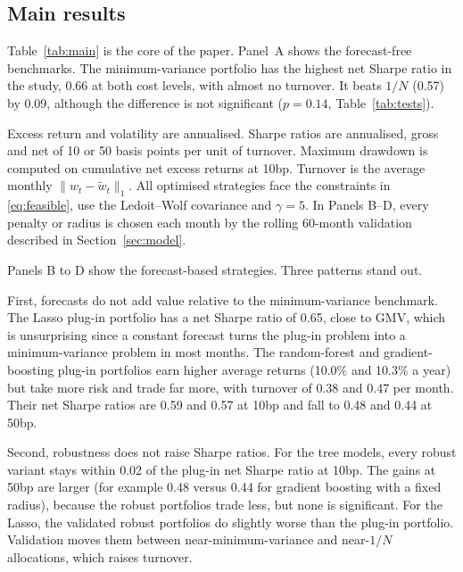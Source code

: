 \documentclass[11pt]{article}
\begin{document}
\subsection{Main results}

Table~\ref{tab:main} is the core of the paper. Panel~A shows the forecast-free benchmarks. The minimum-variance portfolio has the highest net Sharpe ratio in the study, 0.66 at both cost levels, with almost no turnover. It beats $1/N$ (0.57) by 0.09, although the difference is not significant ($p=0.14$, Table~\ref{tab:tests}).

\begin{table}[!htbp]\centering
\caption{Out-of-sample performance, July 1985--June 2026 (492 months)}\label{tab:main}
\small
\begin{minipage}{0.97\linewidth}\footnotesize\smallskip
Excess return and volatility are annualised. Sharpe ratios are annualised, gross and net of 10 or 50 basis points per unit of turnover. Maximum drawdown is computed on cumulative net excess returns at 10bp. Turnover is the average monthly $\lVert w_t-\tilde w_t\rVert_1$. All optimised strategies face the constraints in \eqref{eq:feasible}, use the Ledoit--Wolf covariance and $\gamma=5$. In Panels B--D, every penalty or radius is chosen each month by the rolling 60-month validation described in Section~\ref{sec:model}.
\end{minipage}
\end{table}

Panels B to D show the forecast-based strategies. Three patterns stand out.

First, forecasts do not add value relative to the minimum-variance benchmark. The Lasso plug-in portfolio has a net Sharpe ratio of 0.65, close to GMV, which is unsurprising since a constant forecast turns the plug-in problem into a minimum-variance problem in most months. The random-forest and gradient-boosting plug-in portfolios earn higher average returns (10.0\% and 10.3\% a year) but take more risk and trade far more, with turnover of 0.38 and 0.47 per month. Their net Sharpe ratios are 0.59 and 0.57 at 10bp and fall to 0.48 and 0.44 at 50bp.

Second, robustness does not raise Sharpe ratios. For the tree models, every robust variant stays within 0.02 of the plug-in net Sharpe ratio at 10bp. The gains at 50bp are larger (for example 0.48 versus 0.44 for gradient boosting with a fixed radius), because the robust portfolios trade less, but none is significant. For the Lasso, the validated robust portfolios do slightly worse than the plug-in portfolio. Validation moves them between near-minimum-variance and near-$1/N$ allocations, which raises turnover.
\end{document}
